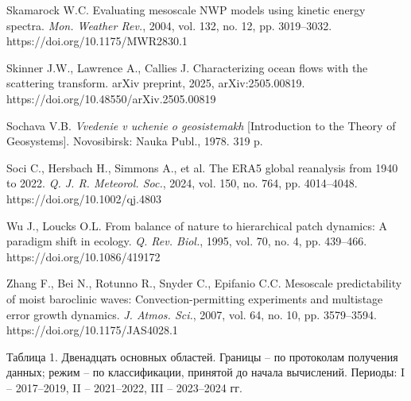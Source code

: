 \documentclass[12pt,a4paper]{article}
\begin{document}
\noindent Skamarock W.C. Evaluating mesoscale NWP models using kinetic energy spectra. \textit{Mon. Weather Rev.}, 2004, vol. 132, no. 12, pp. 3019–3032.\\ https://doi.org/10.1175/MWR2830.1

\noindent Skinner J.W., Lawrence A., Callies J. Characterizing ocean flows with the scattering transform. arXiv preprint, 2025, arXiv:2505.00819.\\ https://doi.org/10.48550/arXiv.2505.00819

\noindent Sochava V.B. \textit{Vvedenie v uchenie o geosistemakh} [Introduction to the Theory of Geosystems]. Novosibirsk: Nauka Publ., 1978. 319 p.

\noindent Soci C., Hersbach H., Simmons A., et al. The ERA5 global reanalysis from 1940 to 2022. \textit{Q. J. R. Meteorol. Soc.}, 2024, vol. 150, no. 764, pp. 4014–4048.\\ https://doi.org/10.1002/qj.4803

\noindent Wu J., Loucks O.L. From balance of nature to hierarchical patch dynamics: A paradigm shift in ecology. \textit{Q. Rev. Biol.}, 1995, vol. 70, no. 4, pp. 439–466.\\ https://doi.org/10.1086/419172

\noindent Zhang F., Bei N., Rotunno R., Snyder C., Epifanio C.C. Mesoscale predictability of moist baroclinic waves: Convection-permitting experiments and multistage error growth dynamics. \textit{J. Atmos. Sci.}, 2007, vol. 64, no. 10, pp. 3579–3594.\\ https://doi.org/10.1175/JAS4028.1

\clearpage
\noindent Таблица 1. Двенадцать основных областей. Границы -- по протоколам получения данных; режим -- по классификации, принятой до начала вычислений. Периоды: I -- 2017--2019, II -- 2021--2022, III -- 2023--2024 гг.
\end{document}
